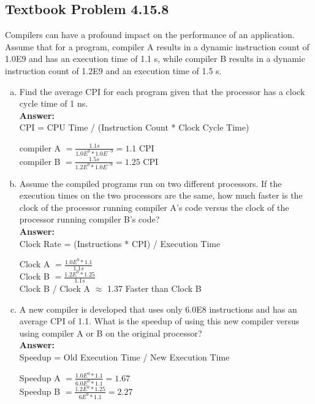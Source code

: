 \documentclass[12pt]{article}
\begin{document}
\subsection{Textbook Problem 4.15.8}
Compilers can have a profound impact on the performance of an application. Assume that for a program, compiler A results in a dynamic instruction count of 1.0E9 and has an execution time of 1.1 s, while compiler B results in a dynamic instruction count of 1.2E9 and an execution time of 1.5 s.

\begin{enumerate}[(a)]
    \item Find the average CPI for each program given that the processor has a clock cycle time of 1 ns.
    \\
    \textbf{Answer:}
    \\
    CPI = CPU Time / (Instruction Count * Clock Cycle Time)
        \begin{center}
            compiler A $ = \frac{1.1s}{1.0E^{9} * 1.0E^{-9}} = 1.1 \text{ CPI} $\\[0.25in]
            compiler B $ = \frac{1.5s}{1.2E^{9} * 1.0E^{-9}} = 1.25 \text{ CPI} $\\
        \end{center}
    
    \item Assume the compiled programs run on two different processors. If the execution times on the two processors are the same, how much faster is the clock of the processor running compiler A's code versus the clock of the processor running compiler B's code?
    \\
    \textbf{Answer:}
    \\
    Clock Rate = (Instructions * CPI) / Execution Time
        \begin{center}
            Clock A $ = \frac{1.0E^{9} * 1.1}{1.1s} $\\[0.25in]
            Clock B $ = \frac{1.2E^{9} * 1.25}{1.1s} $\\[0.25in]
            Clock B / Clock A $\approx$ 1.37 Faster than Clock B\\
        \end{center}
    
    \item A new compiler is developed that uses only 6.0E8 instructions and has an average CPI of 1.1. What is the speedup of using this new compiler versus using compiler A or B on the original processor?
    \\
    \textbf{Answer:}
    \\
    Speedup = Old Execution Time / New Execution Time
        \begin{center}
            Speedup A $ = \frac{1.0E^{9} * 1.1}{6.0E^{9} * 1.1} = 1.67 $\\[0.25in]
            Speedup B $ = \frac{1.2E^{9} * 1.25}{6E^{9} * 1.1} = 2.27$\\[0.25in]
        \end{center}

\end{enumerate}
\end{document}
